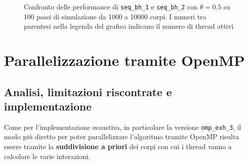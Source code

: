 \documentclass[12pt]{report}
\begin{document}
\begin{figure}[H]

        \caption{Confronto delle performance di \texttt{seq\_bh\_1} e \texttt{seq\_bh\_2} con $\theta = 0.5$ su 100 passi di simulazione da 1000 a 10000 corpi. I numeri tra parentesi nella legenda del grafico indicano il numero di thread attivi}
        \label{fig:seq_2_bh_graph}
    \end{figure}

    \newpage

    \section{Parallelizzazione tramite OpenMP}

    \subsection{Analisi, limitazioni riscontrate e implementazione}

    Come per l'implementazione esaustiva, in particolare la versione \texttt{omp\_exh\_3}, il modo più diretto per poter parallelizzare l'algoritmo tramite OpenMP risulta essere tramite la \textbf{suddivisione a priori} dei corpi con cui i thread vanno a calcolare le varie interazioni.
    
\end{document}
